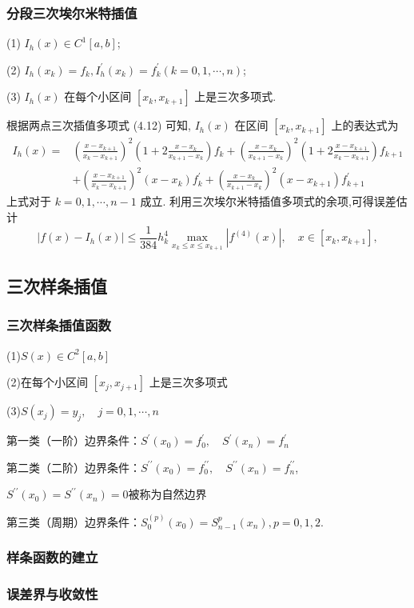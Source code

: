 \subsubsection{分段三次埃尔米特插值}
(1) $I_{h}(x) \in C^{1}[a, b]$;\par
(2) $I_{h}\left(x_{k}\right)=f_{k}, I_{h}^{\prime}\left(x_{k}\right)=f_{k}^{\prime}(k=0,1, \cdots, n)$;\par
(3) $I_{h}(x)$ 在每个小区间 $\left[x_{k}, x_{k+1}\right]$ 上是三次多项式.\par
根据两点三次插值多项式 (4.12) 可知, $I_{h}(x)$ 在区间 $\left[x_{k}, x_{k+1}\right]$ 上的表达式为
$$
\begin{aligned}
I_{h}(x)=&\left(\frac{x-x_{k+1}}{x_{k}-x_{k+1}}\right)^{2}\left(1+2 \frac{x-x_{k}}{x_{k+1}-x_{k}}\right) f_{k}+\left(\frac{x-x_{k}}{x_{k+1}-x_{k}}\right)^{2}\left(1+2 \frac{x-x_{k+1}}{x_{k}-x_{k+1}}\right) f_{k+1} \\
&+\left(\frac{x-x_{k+1}}{x_{k}-x_{k+1}}\right)^{2}\left(x-x_{k}\right) f_{k}^{\prime}+\left(\frac{x-x_{k}}{x_{k+1}-x_{k}}\right)^{2}\left(x-x_{k+1}\right) f_{k+1}^{\prime}
\end{aligned}
$$
上式对于 $k=0,1, \cdots, n-1$ 成立.
利用三次埃尔米特插值多项式的余项,可得误差估计
$$
\left|f(x)-I_{h}(x)\right| \leq \frac{1}{384} h_{k}^{4} \max _{x_{k} \leq x \leq x_{k+1}}\left|f^{(4)}(x)\right|, \quad x \in\left[x_{k}, x_{k+1}\right],
$$

\subsection{三次样条插值}

\subsubsection{三次样条插值函数}
(1)$S(x) \in C^{2}[a, b]$\par
(2)在每个小区间 $\left[x_{j}, x_{j+1}\right]$ 上是三次多项式\par
(3)$S\left(x_{j}\right)=y_{j}, \quad j=0,1, \cdots, n$\par
第一类（一阶）边界条件：$S^{\prime}\left(x_{0}\right)=f_{0}^{\prime}, \quad S^{\prime}\left(x_{n}\right)=f_{n}^{\prime}$\par
第二类（二阶）边界条件：$S^{\prime \prime}\left(x_{0}\right)=f_{0}^{\prime \prime}, \quad S^{\prime \prime}\left(x_{n}\right)=f_{n}^{\prime \prime}$,\par
$S^{\prime \prime}\left(x_{0}\right)=S^{\prime \prime}\left(x_{n}\right)=0$被称为自然边界\par
第三类（周期）边界条件：$S_{0}^{(p)}\left(x_{0}\right)=S_{n-1}^{p}\left(x_{n}\right), p=0,1,2 .$\par

\subsubsection{样条函数的建立}

\subsubsection{误差界与收敛性}
